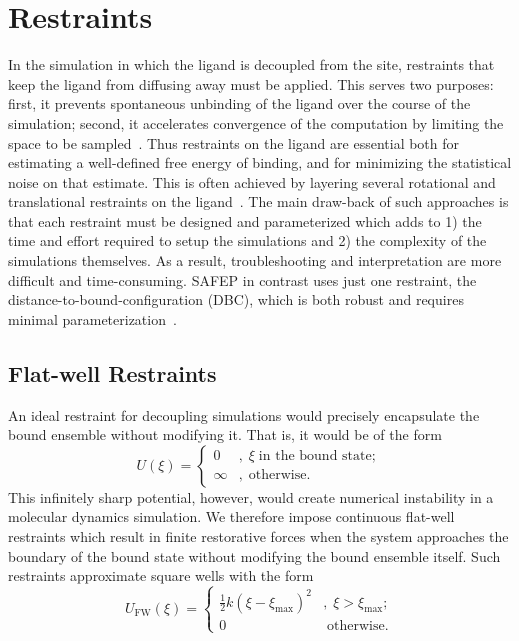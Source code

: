 \documentclass[9pt,tutorial]{Styling/livecoms}
\begin{document}
\section{Restraints}\label{app:restraints}
In the simulation in which the ligand is decoupled from the site, restraints that keep the ligand from diffusing away must be applied. This serves two purposes: first, it prevents spontaneous unbinding of the ligand over the course of the simulation; second, it accelerates convergence of the computation by limiting the space to be sampled~\cite{Hermans1986}.
Thus restraints on the ligand are essential both for estimating a well-defined free energy of binding, and for minimizing the statistical noise on that estimate.
This is often achieved by layering several rotational and translational restraints on the ligand~\cite{Hermans1997, Gilson1997, Boresch2003, Hamelberg2004, Woo2005, Deng2006}.
The main draw-back of such approaches is that each restraint must be designed and parameterized which adds to 1) the time and effort required to setup the simulations and 2) the complexity of the simulations themselves. 
As a result, troubleshooting and interpretation are more difficult and time-consuming. 
SAFEP in contrast uses just one restraint, the distance-to-bound-configuration (DBC), which is both robust and requires minimal parameterization~\cite{Salari2018}.

\subsection{Flat-well Restraints}

An ideal restraint for decoupling simulations would precisely encapsulate the bound ensemble without modifying it. That is, it would be of the form
\begin{equation} \label{eq:squareWell}
    U(\xi) = \begin{cases}
        0 &, \; \xi\; \text{in the bound state};\\
        \infty &, \; \text{otherwise}.
    \end{cases}
\end{equation}
\noindent This infinitely sharp potential, however, would create numerical instability in a molecular dynamics simulation. We therefore impose continuous flat-well restraints which result in finite restorative forces when the system approaches the boundary of the bound state without modifying the bound ensemble itself. Such restraints approximate square wells with the form
\begin{equation} \label{eq:harmonicWall}
    U_\mathrm{FW}(\xi) = \begin{cases}
        \frac{1}{2}k \left(\xi-\xi_\mathrm{max}\right)^2 &, \; \xi > \xi_\mathrm{max};\\
        0                                                & \; \text{otherwise}.
    \end{cases}
\end{equation}
\end{document}

